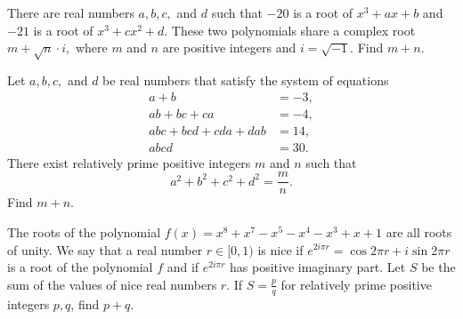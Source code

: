 %	













\begin{question}[name={2021 AIME II, \href{https://artofproblemsolving.com/community/c4p21026751}{Problem 4}}]
	There are real numbers $a, b, c, $ and $d$ such that $-20$ is a root of $x^3 + ax + b$ and $-21$ is a root of $x^3 + cx^2 + d.$ These two polynomials share a complex root $m + \sqrt{n} \cdot i, $ where $m$ and $n$ are positive integers and $i = \sqrt{-1}.$ Find $m+n$.
\end{question}


%	







\begin{question}[name={2021 AIME II, \href{https://artofproblemsolving.com/community/c4p21027050}{Problem 7}}]
	Let $a, b, c,$ and $d$ be real numbers that satisfy the system of equations
	\begin{align*}
		a+b&=-3,\\
		ab+bc+ca&= -4,\\
		abc+bcd+cda+dab&=14,\\
		abcd&=30.
	\end{align*}
	There exist relatively prime positive integers $m$ and $n$ such that $$a^2 + b^2 + c^2 + d^2 = \frac{m}{n}.$$
	Find $m + n$.
\end{question}


%	









\begin{question}[name={2021 PUMaC, Team Round, \href{https://artofproblemsolving.com/community/c4p24986117}{Problem 7}}]
	The roots of the polynomial $f(x) = x^8 +x^7 -x^5 -x^4 -x^3 +x+ 1 $ are all roots of unity. We say that a real number $r \in [0, 1)$ is nice if $e^{2i \pi r} = \cos 2\pi r + i \sin 2\pi r$ is a root of the polynomial $f$ and if $e^{2i \pi r}$ has positive imaginary part. Let $S$ be the sum of the values of nice real numbers $r$. If $S =\frac{p}{q}$ for relatively prime positive integers $p, q$, find $p + q$.	
\end{question}





